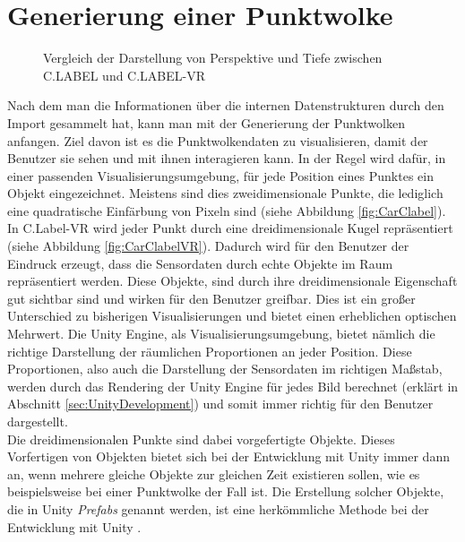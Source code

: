 \section{Generierung einer Punktwolke}
\label{sec:Generierung}
\begin{figure}%
    \centering
    \quad
    \caption{Vergleich der Darstellung von Perspektive und Tiefe zwischen C.LABEL und C.LABEL-VR}
    \label{fig:CloudCompare}%
\end{figure}

Nach dem man die Informationen über die internen Datenstrukturen durch den Import gesammelt hat, kann man mit der Generierung der Punktwolken anfangen. Ziel davon ist es die Punktwolkendaten zu visualisieren, damit der Benutzer sie sehen und mit ihnen interagieren kann. In der Regel wird dafür, in einer passenden Visualisierungsumgebung, für jede Position eines Punktes ein Objekt eingezeichnet. Meistens sind dies zweidimensionale Punkte, die lediglich eine quadratische Einfärbung von Pixeln sind (siehe Abbildung \ref{fig:CarClabel}).\\

In C.Label-VR wird jeder Punkt durch eine dreidimensionale Kugel repräsentiert (siehe Abbildung \ref{fig:CarClabelVR}). Dadurch wird für den Benutzer der Eindruck erzeugt, dass die Sensordaten durch echte Objekte im Raum repräsentiert werden. Diese Objekte, sind durch ihre dreidimensionale Eigenschaft gut sichtbar sind und wirken für den Benutzer greifbar. Dies ist ein großer Unterschied zu bisherigen Visualisierungen und bietet einen erheblichen optischen Mehrwert. Die Unity Engine, als Visualisierungsumgebung, bietet nämlich die richtige Darstellung der räumlichen Proportionen an jeder Position. Diese Proportionen, also auch die Darstellung der Sensordaten im richtigen Maßstab, werden durch das Rendering der Unity Engine für jedes Bild berechnet (erklärt in Abschnitt \ref{sec:UnityDevelopment}) und somit immer richtig für den Benutzer dargestellt.\\

Die dreidimensionalen Punkte sind dabei vorgefertigte Objekte. Dieses Vorfertigen von Objekten bietet sich bei der Entwicklung mit Unity immer dann an, wenn mehrere gleiche Objekte zur gleichen Zeit existieren sollen, wie es beispielsweise bei einer Punktwolke der Fall ist. Die Erstellung solcher Objekte, die in Unity \textit{Prefabs} genannt werden, ist eine herkömmliche Methode bei der Entwicklung mit Unity \cite{bib:UnityPrefab}.\\ 

